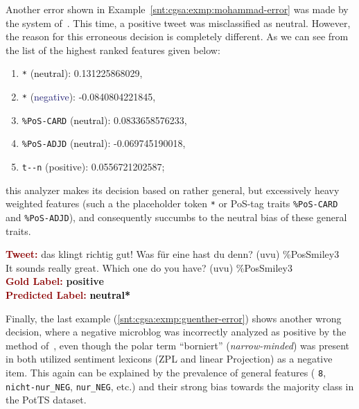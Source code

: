 Another error shown in Example~\ref{snt:cgsa:exmp:mohammad-error} was
made by the system of~\citet{Mohammad:13}.  This time, a positive
tweet was misclassified as neutral.  However, the reason for this
erroneous decision is completely different.  As we can see from the
list of the highest ranked features given below:
\begin{enumerate}
\item \texttt{*} (\textcolor{black}{neutral}): 0.131225868029,
\item \texttt{*} (\textcolor{midnightblue}{negative}): -0.0840804221845,
\item \texttt{\%PoS-CARD} (\textcolor{black}{neutral}): 0.0833658576233,
\item \texttt{\%PoS-ADJD} (\textcolor{black}{neutral}): -0.069745190018,
\item \texttt{t-\textvisiblespace{}-n} (\textcolor{green3}{positive}): 0.0556721202587;
\end{enumerate}
this analyzer makes its decision based on rather general, but
excessively heavy weighted features (such a the placeholder token
\texttt{*} or PoS-tag traits \texttt{\%PoS-CARD} and
\texttt{\%PoS-ADJD}), and consequently succumbs to the neutral bias of
these general traits.

\begin{example}\label{snt:cgsa:exmp:mohammad-error}
  \noindent\textup{\bfseries\textcolor{darkred}{Tweet:}} {\upshape das
    klingt richtig gut! Was f\"ur eine hast du denn? (uvu) \%PosSmiley3}\\
  \noindent It sounds really great.  Which one do you have? (uvu) \%PosSmiley3\\[\exampleSep]
  \noindent\textup{\bfseries\textcolor{darkred}{Gold Label:}}\hspace*{4.3em}\textbf{%
    \upshape\textcolor{green3}{positive}}\\
 \noindent\textup{\bfseries\textcolor{darkred}{Predicted Label:}}\hspace*{2em}\textbf{%
    \upshape\textcolor{black}{neutral*}}
\end{example}

Finally, the last example (\ref{snt:cgsa:exmp:guenther-error}) shows
another wrong decision, where a negative microblog was incorrectly
analyzed as positive by the method of~\citet{Guenther:14}, even though
the polar term ``borniert'' (\emph{narrow-minded}) was present in both
utilized sentiment lexicons (ZPL and linear Projection) as a negative
item.  This again can be explained by the prevalence of general
features (\eg{} \texttt{8}, \texttt{nicht-nur\_NEG},
\texttt{nur\_NEG}, etc.) and their strong bias towards the majority
class in the PotTS dataset.

